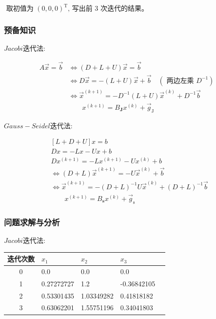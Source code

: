 \documentclass[UTF8]{ctexart}
\begin{document}
$\text { 取初值为 }(0,0,0)^{\mathrm{T}} \text {, 写出前 } 3 \text { 次迭代的结果。 }$

\subsubsection{预备知识}
$Jacobi$迭代法:

\begin{equation}\nonumber
    \begin{aligned}
        A \vec{x}=\vec{b} & \Leftrightarrow(D+L+U) \vec{x}=\vec{b} \\
        & \Leftrightarrow D \vec{x}=-(L+U) \vec{x}+\vec{b} \quad (\text { 两边左乘 } D^{-1}) \\
        & \Leftrightarrow \vec{x}^{(k+1)}=-D^{-1}(L+U) \vec{x}^{(k)}+D^{-1} \vec{b}\\
        & \quad\quad{x}^{(k+1)}={B}_{\mathbf{J}} {x}^{(k)}+\vec{g}_{\mathrm{J}}
        \end{aligned}
\end{equation}

\quad

$Gauss-Seidel$迭代法:

\begin{equation}\nonumber
    \begin{aligned}
        &{[L+D+U] x=b} \\
        &D x=-L x-U x+b \\
        &D x^{(k+1)}=-L x^{(k+1)}-U x^{(k)}+b \\
        &\Leftrightarrow(D+L) \vec{x}^{(k+1)}=-U \vec{x}^{(k)}+\vec{b} \\
        &\Leftrightarrow \vec{x}^{(k+1)}=-(D+L)^{-1} U \vec{x}^{(k)}+(D+L)^{-1} \vec{b} \\
        & \quad\quad{x}^{(k+1)}={B}_{\mathbf{s}} {x}^{(k)}+\vec{g}_{\mathrm{s}}
        \end{aligned}
\end{equation}
\subsubsection{问题求解与分析}
$Jacobi$迭代法:

\begin{table}[h]
    \vspace{20pt}
    \centering
    \begin{tabular}{cllll}
        \hline
        迭代次数 & $x_1$& $x_2$ & $x_3$\\
        \hline
        0  & 0.0          & 0.0             & 0.0           \\
        1  & 0.27272727   & 1.2             & -0.36842105   \\
        2  & 0.53301435   & 1.03349282      & 0.41818182    \\
        3  & 0.63062201   & 1.55751196      & 0.34041803    \\
        \hline       
    \end{tabular}
\end{table}
\end{document}

